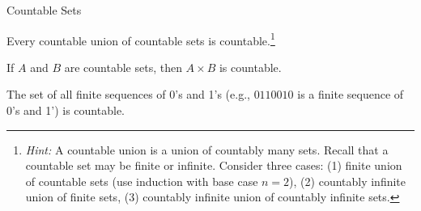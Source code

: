 \begin{section}{Countable Sets}
\begin{theorem}
Every countable union of countable sets is countable.\footnote{\emph{Hint:} A countable union is a union of countably many sets.  Recall that a countable set may be finite or infinite.  Consider three cases: (1) finite union of countable sets (use induction with base case $n=2$), (2) countably infinite union of finite sets, (3) countably infinite union of countably infinite sets.}
\end{theorem}

\begin{theorem}
If $A$ and $B$ are countable sets, then $A\times B$ is countable.
\end{theorem}

\begin{theorem}
The set of all finite sequences of 0's and 1's (e.g., $0110010$ is a finite sequence of 0's and 1') is countable. 
\end{theorem}

\end{section}